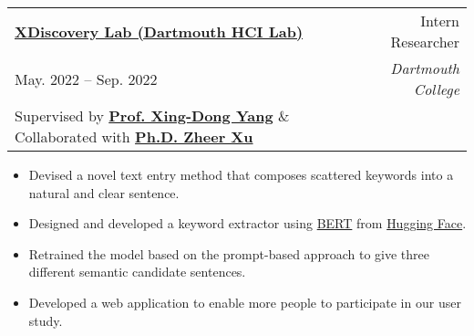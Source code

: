 \documentclass[letterpaper,11pt]{article}
\makeatletter
\newcommand{\resumeItem}[1]{
  \item\small{
    {#1 \vspace{-2pt}}
  }
}
\newcommand{\researchWithCollab}[6]{
    \item
    \begin{tabular*}{1.0\textwidth}[t]{l@{\extracolsep{\fill}}r}
      \textbf{\small{#1}} & {#2} \\
      {#3} & \textit{#4} \\
      Supervised by \textbf{\small{#5}} \& Collaborated with \textbf{\small{#6}}
    \end{tabular*}\vspace{-7pt}
}
\newcommand{\resumeItemListStart}{\begin{itemize}}
\newcommand{\resumeItemListEnd}{\end{itemize}\vspace{-5pt}}
\makeatother
\begin{document}
      \researchWithCollab
        {\href{https://www.cs.dartmouth.edu/~hci/}{XDiscovery Lab (Dartmouth HCI Lab)}}
        {Intern Researcher}
        {May. 2022 -- Sep. 2022}
        {Dartmouth College}
        {\href{https://www.cs.dartmouth.edu/~xingdong/}{Prof. Xing-Dong Yang}}
        {\href{https://cs.dartmouth.edu/~zheer/index.html}{Ph.D. Zheer Xu}}
          \resumeItemListStart
            \resumeItem{Devised a novel text entry method that composes scattered keywords into a natural and clear sentence. }
            \resumeItem{Designed and developed a keyword extractor using \href{https://huggingface.co/bert-base-uncased}{BERT} from \href{https://huggingface.co/}{Hugging Face}. }
            \resumeItem{Retrained the model based on the prompt-based approach to give three different semantic candidate sentences. }
            \resumeItem{Developed a web application to enable more people to participate in our user study. }
          \resumeItemListEnd
          
\end{document}
